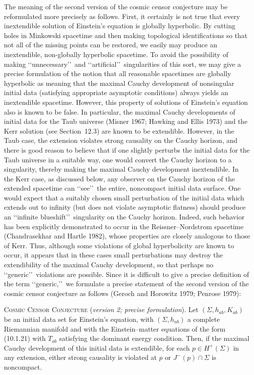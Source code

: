 The meaning of the second version of the cosmic censor conjecture may be
reformulated more precisely as follows. First, it certainly is not true that every
inextendible solution of Einstein's equation is globally hyperbolic. By cutting holes
in Minkowski spacetime and then making topological identifications so that not all of
the missing points can be restored, we easily may produce an inextendible,
non-globally hyperbolic spacetime. To avoid the possibility of making
\lq\lq unnecessary\rq\rq\ and \lq\lq artificial\rq\rq\ singularities of this sort, we may
give a precise formulation of the notion that all reasonable spacetimes are globally
hyperbolic as meaning that the maximal Cauchy development of nonsingular initial
data (satisfying appropriate asymptotic conditions) always yields an inextendible
spacetime. However, this property of solutions of Einstein's equation also is known
to be false. In particular, the maximal Cauchy developments of initial data for the
Taub universe (Misner 1967; Hawking and Ellis 1973) and the Kerr solution (see
Section~12.3) are known to be extendible. However, in the Taub case, the extension
violates strong causality on the Cauchy horizon, and there is good reason to believe
that if one slightly perturbs the initial data for the Taub universe in a suitable way,
one would convert the Cauchy horizon to a singularity, thereby making the maximal
Cauchy development inextendible. In the Kerr case, as discussed below, any observer
on the Cauchy horizon of the extended spacetime can \lq\lq see\rq\rq\ the entire,
noncompact initial data surface. One would expect that a suitably chosen small
perturbation of the initial data which extends out to infinity (but does not violate
asymptotic flatness) should produce an \lq\lq infinite blueshift\rq\rq\ singularity on
the Cauchy horizon. Indeed, such behavior has been explicitly demonstrated to occur
in the Reissner--Nordstrom spacetime (Chandrasekhar and Hartle 1982), whose
properties are closely analogous to those of Kerr. Thus, although some violations of
global hyperbolicity are known to occur, it appears that in these cases small
perturbations may destroy the extendibility of the maximal Cauchy development, so
that perhaps no \lq\lq generic\rq\rq\ violations are possible. Since it is difficult to
give a precise definition of the term \lq\lq generic,\rq\rq\ we formulate a precise
statement of the second version of the cosmic censor conjecture as follows (Geroch
and Horowitz 1979; Penrose 1979):

\medskip
\noindent\textsc{Cosmic Censor Conjecture} (\emph{version 2; precise formulation}).
Let \((\Sigma,h_{ab},K_{ab})\) be an initial data set for Einstein's equation, with
\((\Sigma,h_{ab})\) a complete Riemannian manifold and with the Einstein--matter
equations of the form (10.1.21) with \(T_{ab}\) satisfying the dominant energy
condition. Then, if the maximal Cauchy development of this initial data is
extendible, for each \(p\in H^+(\Sigma)\) in any extension, either strong causality
is violated at \(p\) or \(J^-(p)\cap\Sigma\) is noncompact.
\medskip

